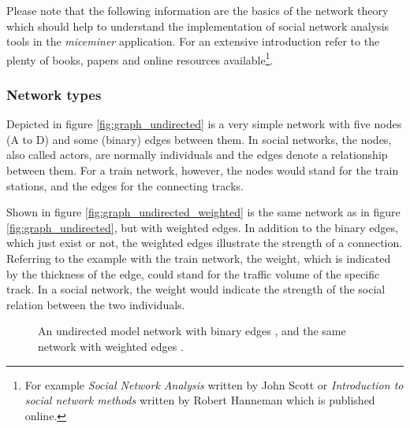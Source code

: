 Please note that the following information are the basics of the network theory which should help to understand the implementation of social network analysis tools in the \textit{miceminer} application. For an extensive introduction refer to the plenty of books, papers and online resources available\footnote{For example \textit{Social Network Analysis} written by John Scott\cite{scott:00} or \textit{Introduction to social network methods} written by Robert Hanneman\cite{hanneman:05} which is published online.}.

\subsubsection{Network types}
\label{subsubsec:net_types}
Depicted in figure \ref{fig:graph_undirected} is a very simple network with five nodes (A to D) and some (binary) edges between them. In social networks, the nodes, also called actors, are normally individuals and the edges denote a relationship between them. For a train network, however, the nodes would stand for the train stations, and the edges for the connecting tracks.

Shown in figure \ref{fig:graph_undirected_weighted} is the same network as in figure \ref{fig:graph_undirected}, but with weighted edges. In addition to the binary edges, which just exist or not, the weighted edges illustrate the strength of a connection. Referring to the example with the train network, the weight, which is indicated by the thickness of the edge, could stand for the traffic volume of the specific track. In a social network, the weight would indicate the strength of the social relation between the two individuals.  


\begin{figure}[htpb]%
	\centering 
	\qquad 
	\caption[Undirected model network with binary and weighted edges]{An undirected model network with binary edges , and the same network with weighted edges .} 

\end{figure}	 

